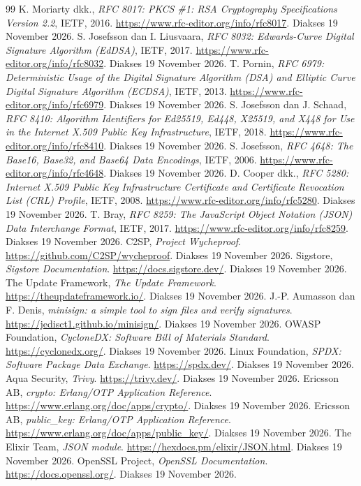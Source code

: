 \begin{thebibliography}{99}
   K. Moriarty dkk., \textit{RFC 8017: PKCS \#1: RSA Cryptography Specifications Version 2.2}, IETF, 2016. \url{https://www.rfc-editor.org/info/rfc8017}. Diakses 19 November 2026.
   S. Josefsson dan I. Liusvaara, \textit{RFC 8032: Edwards-Curve Digital Signature Algorithm (EdDSA)}, IETF, 2017. \url{https://www.rfc-editor.org/info/rfc8032}. Diakses 19 November 2026.
   T. Pornin, \textit{RFC 6979: Deterministic Usage of the Digital Signature Algorithm (DSA) and Elliptic Curve Digital Signature Algorithm (ECDSA)}, IETF, 2013. \url{https://www.rfc-editor.org/info/rfc6979}. Diakses 19 November 2026.
   S. Josefsson dan J. Schaad, \textit{RFC 8410: Algorithm Identifiers for Ed25519, Ed448, X25519, and X448 for Use in the Internet X.509 Public Key Infrastructure}, IETF, 2018. \url{https://www.rfc-editor.org/info/rfc8410}. Diakses 19 November 2026.
   S. Josefsson, \textit{RFC 4648: The Base16, Base32, and Base64 Data Encodings}, IETF, 2006. \url{https://www.rfc-editor.org/info/rfc4648}. Diakses 19 November 2026.
   D. Cooper dkk., \textit{RFC 5280: Internet X.509 Public Key Infrastructure Certificate and Certificate Revocation List (CRL) Profile}, IETF, 2008. \url{https://www.rfc-editor.org/info/rfc5280}. Diakses 19 November 2026.
   T. Bray, \textit{RFC 8259: The JavaScript Object Notation (JSON) Data Interchange Format}, IETF, 2017. \url{https://www.rfc-editor.org/info/rfc8259}. Diakses 19 November 2026.
   C2SP, \textit{Project Wycheproof}. \url{https://github.com/C2SP/wycheproof}. Diakses 19 November 2026.
   Sigstore, \textit{Sigstore Documentation}. \url{https://docs.sigstore.dev/}. Diakses 19 November 2026.
   The Update Framework, \textit{The Update Framework}. \url{https://theupdateframework.io/}. Diakses 19 November 2026.
   J.-P. Aumasson dan F. Denis, \textit{minisign: a simple tool to sign files and verify signatures}. \url{https://jedisct1.github.io/minisign/}. Diakses 19 November 2026.
   OWASP Foundation, \textit{CycloneDX: Software Bill of Materials Standard}. \url{https://cyclonedx.org/}. Diakses 19 November 2026.
   Linux Foundation, \textit{SPDX: Software Package Data Exchange}. \url{https://spdx.dev/}. Diakses 19 November 2026.
   Aqua Security, \textit{Trivy}. \url{https://trivy.dev/}. Diakses 19 November 2026.
   Ericsson AB, \textit{crypto: Erlang/OTP Application Reference}. \url{https://www.erlang.org/doc/apps/crypto/}. Diakses 19 November 2026.
   Ericsson AB, \textit{public\_key: Erlang/OTP Application Reference}. \url{https://www.erlang.org/doc/apps/public_key/}. Diakses 19 November 2026.
   The Elixir Team, \textit{JSON module}. \url{https://hexdocs.pm/elixir/JSON.html}. Diakses 19 November 2026.
   OpenSSL Project, \textit{OpenSSL Documentation}. \url{https://docs.openssl.org/}. Diakses 19 November 2026.
\end{thebibliography}
